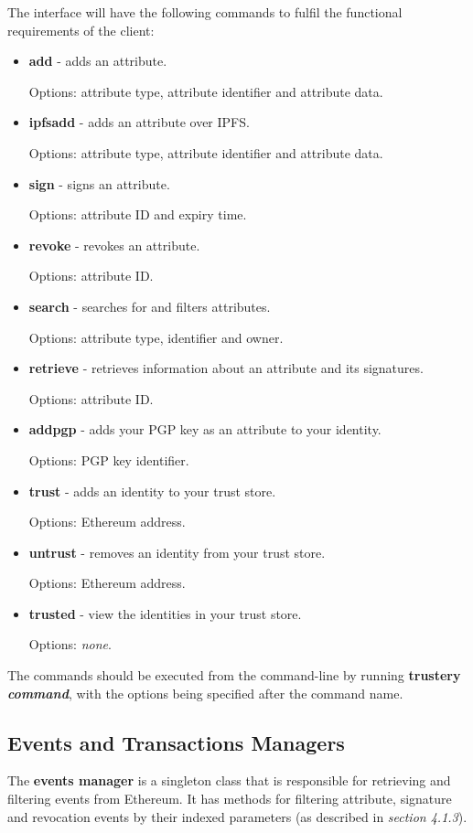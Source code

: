 \documentclass[12pt,a4paper]{report}
\begin{document}
	The interface will have the following commands to fulfil the functional requirements of the client:
	\begin{itemize}
		\item \textbf{add} - adds an attribute.
		
		Options: attribute type, attribute identifier and attribute data.
		\item \textbf{ipfsadd} - adds an attribute over IPFS.
		
		Options: attribute type, attribute identifier and attribute data.
		\item \textbf{sign} - signs an attribute.
		
		Options: attribute ID and expiry time.
		\item \textbf{revoke} - revokes an attribute.
		
		Options: attribute ID.
		
		\item \textbf{search} - searches for and filters attributes.
		
		Options: attribute type, identifier and owner.
		
		\item \textbf{retrieve} - retrieves information about an attribute and its signatures.
		
		Options: attribute ID.
		
		\item \textbf{addpgp} - adds your PGP key as an attribute to your identity.
		
		Options: PGP key identifier.
		
		\item \textbf{trust} - adds an identity to your trust store.
		
		Options: Ethereum address.
		
		\item \textbf{untrust} - removes an identity from your trust store.
		
		Options: Ethereum address.
		
		\item \textbf{trusted} - view the identities in your trust store.
		
		Options: \textit{none}.
	\end{itemize}
	
	The commands should be executed from the command-line by running \textbf{trustery \textit{command}}, with the options being specified after the command name.
	
	\subsection{Events and Transactions Managers}
	The \textbf{events manager} is a singleton class that is responsible for retrieving and filtering events from Ethereum. It has methods for filtering attribute, signature and revocation events by their indexed parameters (as described in \textit{section 4.1.3}).
	
\end{document}
